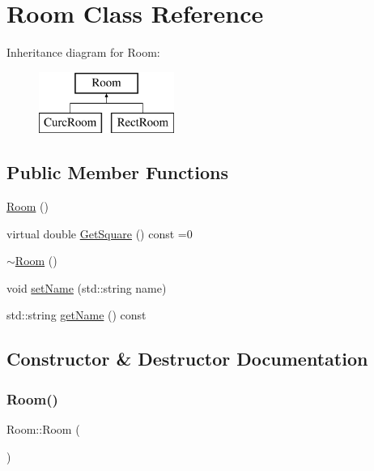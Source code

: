 \hypertarget{class_room}{}\section{Room Class Reference}
\label{class_room}
Inheritance diagram for Room\+:\begin{figure}[H]
\begin{center}
\leavevmode
\includegraphics[height=2.000000cm]{class_room}
\end{center}
\end{figure}
\subsection*{Public Member Functions}
\begin{DoxyCompactItemize}
\item 
\mbox{\hyperlink{class_room_ac6ef93a7d9c3e1d624e025058d5f16ff}{Room}} ()
\item 
virtual double \mbox{\hyperlink{class_room_a031b559260949b3fa9e27053aaf602f5}{Get\+Square}} () const =0
\item 
\mbox{\hyperlink{class_room_a67d5da09983cc53097807fd43ba5481a}{$\sim$\+Room}} ()
\item 
void \mbox{\hyperlink{class_room_af7f292c9e840184a5df8525687e87367}{set\+Name}} (std\+::string name)
\item 
std\+::string \mbox{\hyperlink{class_room_a767de198f529425dd4ba81810e44d6e4}{get\+Name}} () const
\end{DoxyCompactItemize}


\subsection{Constructor \& Destructor Documentation}
\mbox{\label{class_room_ac6ef93a7d9c3e1d624e025058d5f16ff}} 
\subsubsection{\texorpdfstring{Room()}{Room()}}
{\footnotesize\ttfamily Room\+::\+Room (\begin{DoxyParamCaption}{ }\end{DoxyParamCaption})}


